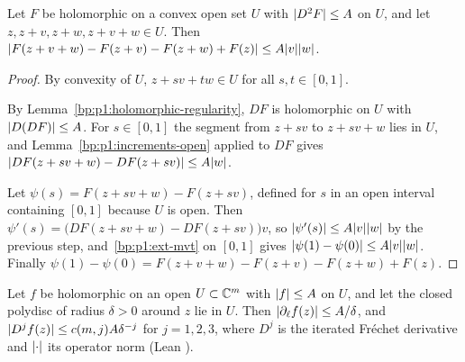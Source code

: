\begin{lemma}\label{bp:p1:mixed-difference}
Let $F$ be holomorphic on a convex open set $U$ with $\lvert D^2F\rvert\le A$ on $U$, and let
$z,z+v,z+w,z+v+w\in U$. Then $\lvert F(z+v+w)-F(z+v)-F(z+w)+F(z)\rvert\le A\lvert v\rvert\lvert w\rvert$.
\end{lemma}

\begin{proof}
By convexity of $U$, $z+sv+tw\in U$ for all $s,t\in[0,1]$.

\label{step:p1:md-inner}
By Lemma~\ref{bp:p1:holomorphic-regularity}, $DF$ is holomorphic on $U$ with $\lvert D(DF)\rvert\le A$. For
$s\in[0,1]$ the segment from $z+sv$ to $z+sv+w$ lies in $U$, and Lemma~\ref{bp:p1:increments-open}
applied to $DF$ gives $\lvert DF(z+sv+w)-DF(z+sv)\rvert\le A\lvert w\rvert$.

\label{step:p1:md-outer}
Let $\psi(s)=F(z+sv+w)-F(z+sv)$, defined for $s$ in an open interval containing $[0,1]$ because $U$ is
open. Then $\psi'(s)=\bigl(DF(z+sv+w)-DF(z+sv)\bigr)v$, so
$\lvert \psi'(s)\rvert\le A\lvert v\rvert\lvert w\rvert$ by the previous step, and~\ref{bp:p1:ext-mvt} on $[0,1]$ gives
$\lvert \psi(1)-\psi(0)\rvert\le A\lvert v\rvert\lvert w\rvert$. Finally $\psi(1)-\psi(0)=F(z+v+w)-F(z+v)-F(z+w)+F(z)$.
\end{proof}

\begin{lemma}\label{bp:p1:cauchy-open}
Let $f$ be holomorphic on an open $U\subset\mathbb{C}^m$ with $\lvert f\rvert\le A$ on $U$, and let the closed
polydisc of radius $\delta>0$ around $z$ lie in $U$. Then $\lvert \partial_\ell f(z)\rvert\le A/\delta$, and
$\lvert D^jf(z)\rvert\le c(m,j)A\delta^{-j}$ for $j=1,2,3$, where $D^j$ is the iterated Fréchet derivative and
$\lvert \cdot\rvert$ its operator norm (Lean ).
\end{lemma}

